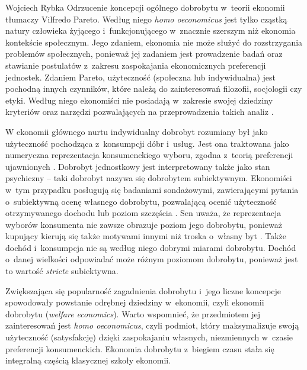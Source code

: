 \begin{artplenv}{Wojciech Rybka}
Odrzucenie koncepcji ogólnego dobrobytu w~teorii ekonomii tłumaczy Vilfredo Pareto. Według niego \textit{homo
oeconomicus} jest tylko cząstką natury człowieka żyjącego  i~funkcjonującego w~znacznie szerszym niż ekonomia
kontekście społecznym. Jego zdaniem, ekonomia nie może służyć do rozstrzygania problemów społecznych, ponieważ jej
zadaniem jest prowadzenie badań oraz stawianie postulatów z~zakresu zaspokajania ekonomicznych preferencji jednostek.
Zdaniem Pareto, użyteczność (społeczna lub indywidualna) jest pochodną innych czynników, które należą do zainteresowań
filozofii, socjologii czy etyki. Według niego ekonomiści nie posiadają w~zakresie swojej dziedziny kryteriów oraz
narzędzi pozwalających na przeprowadzenia takich analiz
\parencite{czech_ekonomia_2014}.

W ekonomii głównego nurtu indywidualny dobrobyt rozumiany był jako użyteczność pochodząca z~konsumpcji dóbr i~usług.
Jest ona traktowana jako numeryczna reprezentacja konsumenckiego wyboru, zgodna z~teorią preferencji ujawnionych
\parencites{boehm_is_2002}{ostapiuk_droga_2019}.
Dobrobyt jednostkowy jest interpretowany także jako
stan psychiczny -- taki dobrobyt nazywa się dobrobytem subiektywnym. Ekonomiści w~tym przypadku posługują się badaniami
sondażowymi, zawierającymi pytania o~subiektywną ocenę własnego dobrobytu, pozwalającą ocenić użyteczność otrzymywanego
dochodu
\parencite{kot_ekonometryczne_2000}
lub poziom szczęścia
\parencite{blanchflower_well-being_2004}.
Sen uważa, że reprezentacja wyborów konsumenta nie zawsze obrazuje poziom jego dobrobytu, ponieważ
kupujący kierują się także motywami innymi niż troska o~własny byt
\parencite{zaremba_dobrobyt_2016}.
Także
dochód i~konsumpcja nie są według niego dobrymi miarami dobrobytu. Dochód o~danej wielkości odpowiadać może różnym
poziomom dobrobytu, ponieważ jest to wartość \textit{stricte} subiektywna. 

Zwiększająca się popularność zagadnienia dobrobytu i~jego liczne koncepcje spowodowały powstanie odrębnej
dziedziny w~ekonomii, czyli ekonomii dobrobytu (\textit{welfare economics}). Warto wspomnieć,
że przedmiotem jej zainteresowań jest
\textit{homo oeconomicus}, czyli podmiot, który maksymalizuje swoją użyteczność (satysfakcję) dzięki zaspokajaniu
własnych, niezmiennych w~czasie preferencji konsumenckich. Ekonomia dobrobytu z~biegiem czasu stała się integralną
częścią klasycznej szkoły ekonomii. 


\end{artplenv}
